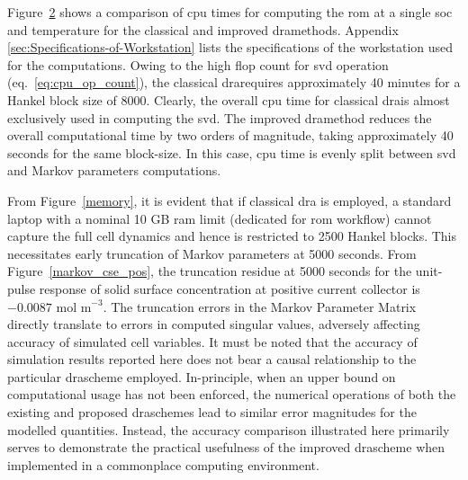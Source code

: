 

\begin{figure}
	\caption{}
	\label{fig:memory}
\end{figure}

Figure~\ref{cputime} shows a comparison of \gls{cpu} times for computing
the \gls{rom} at a single \gls{soc} and temperature for the classical and improved
\gls{dra}methods. Appendix \ref{sec:Specifications-of-Workstation} lists the specifications
of the workstation used for the computations. Owing to the high flop
count for \gls{svd} operation (eq.~\ref{eq:cpu_op_count}), the classical
\gls{dra}requires approximately 40 minutes for a Hankel block size of 8000.
Clearly, the overall \gls{cpu} time for classical \gls{dra}is almost exclusively
used in computing the \gls{svd}. The improved \gls{dra}method reduces the overall
computational time by two orders of magnitude, taking approximately
40 seconds for the same block-size. In this case, \gls{cpu} time is evenly
split between \gls{svd} and Markov parameters computations.

\begin{figure}
	\caption{}
	\label{cputime}
\end{figure}

From Figure~\ref{memory}, it is evident that if classical \gls{dra}
is employed, a standard laptop with a nominal 10 GB \gls{ram} limit (dedicated
for \gls{rom} workflow) cannot capture the full cell dynamics and hence
is restricted to 2500 Hankel blocks. This necessitates early truncation
of Markov parameters at 5000 seconds. From Figure~\ref{markov_cse_pos},
the truncation residue at 5000 seconds for the unit-pulse response
of solid surface concentration at positive current collector is $-0.0087 \text{ mol m}^{-\text{3}}$.
The truncation errors in the Markov Parameter Matrix directly translate
to errors in computed singular values, adversely affecting accuracy
of simulated cell variables. It must be noted that the accuracy of
simulation results reported here does not bear a causal relationship
to the particular \gls{dra}scheme employed. In-principle, when an upper
bound on computational usage has not been enforced, the numerical
operations of both the existing and proposed \gls{dra}schemes lead to similar
error magnitudes for the modelled quantities. Instead, the accuracy
comparison illustrated here primarily serves to demonstrate the practical
usefulness of the improved \gls{dra}scheme when implemented in a commonplace
computing environment.

\begin{figure}
	\caption{}
	\label{truncated}
\end{figure}

